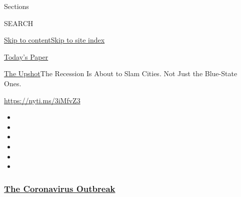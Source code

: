 Sections

SEARCH

\protect\hyperlink{site-content}{Skip to
content}\protect\hyperlink{site-index}{Skip to site index}

\href{https://myaccount.nytimes3xbfgragh.onion/auth/login?response_type=cookie\&client_id=vi}{}

\href{https://www.nytimes3xbfgragh.onion/section/todayspaper}{Today's
Paper}

\href{/section/upshot}{The Upshot}\textbar{}The Recession Is About to
Slam Cities. Not Just the Blue-State Ones.

\url{https://nyti.ms/3iMfvZ3}

\begin{itemize}
\item
\item
\item
\item
\item
\item
\end{itemize}

\hypertarget{the-coronavirus-outbreak}{%
\subsubsection{\texorpdfstring{\href{https://www.nytimes3xbfgragh.onion/news-event/coronavirus?name=styln-coronavirus-national\&region=TOP_BANNER\&variant=undefined\&block=storyline_menu_recirc\&action=click\&pgtype=Article\&impression_id=868e7b80-e38d-11ea-85e7-9f87a3618d91}{The
Coronavirus
Outbreak}}{The Coronavirus Outbreak}}\label{the-coronavirus-outbreak}}

